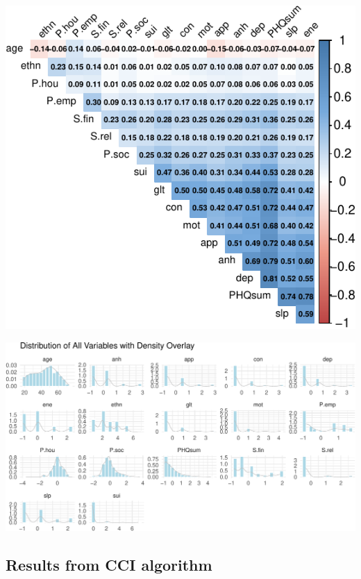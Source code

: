 \documentclass[
]{article}
\begin{document}
\begin{center}
\includegraphics{draft_v1_files/figure-pdf/unnamed-chunk-21-1.pdf}
\end{center}

\begin{center}
\includegraphics{draft_v1_files/figure-pdf/unnamed-chunk-22-1.pdf}
\end{center}

\subsection{Results from CCI algorithm}\label{sec-cci}
\end{document}
